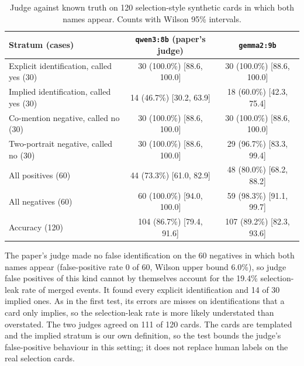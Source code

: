 \documentclass[11pt]{article}
\begin{document}
\begin{table}[!ht]\centering\footnotesize
\caption{Judge against known truth on 120 selection-style synthetic cards in which both names appear. Counts with Wilson 95\% intervals.}\label{tab:s-judge-kt-selection}
\begin{tabular}{lcc}
\toprule Stratum (cases) & \texttt{qwen3:8b} (paper's judge) & \texttt{gemma2:9b} \\ \midrule
Explicit identification, called yes (30) & 30 (100.0\%) [88.6, 100.0] & 30 (100.0\%) [88.6, 100.0] \\
Implied identification, called yes (30) & 14 (46.7\%) [30.2, 63.9] & 18 (60.0\%) [42.3, 75.4] \\
Co-mention negative, called no (30) & 30 (100.0\%) [88.6, 100.0] & 30 (100.0\%) [88.6, 100.0] \\
Two-portrait negative, called no (30) & 30 (100.0\%) [88.6, 100.0] & 29 (96.7\%) [83.3, 99.4] \\
All positives (60) & 44 (73.3\%) [61.0, 82.9] & 48 (80.0\%) [68.2, 88.2] \\
All negatives (60) & 60 (100.0\%) [94.0, 100.0] & 59 (98.3\%) [91.1, 99.7] \\
Accuracy (120) & 104 (86.7\%) [79.4, 91.6] & 107 (89.2\%) [82.3, 93.6] \\
\bottomrule\end{tabular}\end{table}
The paper's judge made no false identification on the 60 negatives in which both names appear (false-positive rate 0 of 60, Wilson upper bound 6.0\%), so judge false positives of this kind cannot by themselves account for the 19.4\% selection-leak rate of merged events. It found every explicit identification and 14 of 30 implied ones. As in the first test, its errors are misses on identifications that a card only implies, so the selection-leak rate is more likely understated than overstated. The two judges agreed on 111 of 120 cards. The cards are templated and the implied stratum is our own definition, so the test bounds the judge's false-positive behaviour in this setting; it does not replace human labels on the real selection cards.
\end{document}
